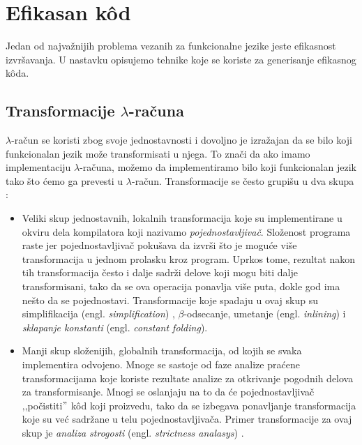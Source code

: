 \section{Efikasan k\^od}
\label{sec:efikasan kod}


Jedan od najvažnijih problema vezanih za funkcionalne jezike jeste efikasnost izvršavanja. 
U nastavku opisujemo tehnike koje se koriste za generisanje efikasnog k\^oda.	


\subsection{Transformacije $\lambda$-računa}

$\lambda$-račun se koristi zbog svoje jednostavnosti i dovoljno je izražajan da se bilo koji funkcionalan jezik može transformisati u njega. To znači da ako imamo implementaciju $\lambda$-računa, možemo da implementiramo  bilo koji funkcionalan jezik tako što ćemo ga prevesti u $\lambda$-račun. Transformacije se često grupišu u dva skupa :


\begin{itemize}
	\item Veliki skup jednostavnih, lokalnih transformacija koje su implementirane u okviru dela kompilatora koji nazivamo \textit{pojednostavljivač}. Složenost programa raste jer pojednostavljivač pokušava da izvrši što je moguće više transformacija u jednom prolasku kroz program. Uprkos tome, rezultat nakon tih transformacija često i dalje sadrži delove koji mogu biti dalje transformisani, tako da se ova operacija ponavlja više puta, dokle god ima nešto da se pojednostavi. Transformacije koje spadaju u ovaj skup su simplifikacija (engl. \textit{simplification}) \cite{compilation-by-program-transformation}, $\beta$-odsecanje, umetanje (engl. \textit{inlining}) i \textit{sklapanje konstanti} (engl. \textit{constant folding}).
	
	\item Manji skup složenijih, globalnih transformacija, od kojih se svaka implementira odvojeno. Mnoge se sastoje od faze analize praćene transformacijama koje koriste rezultate analize za otkrivanje pogodnih delova za transformisanje. Mnogi se oslanjaju na to da će pojednostavljivač ‚‚počistiti$"$ k\^ od koji proizvedu, tako da se izbegava ponavljanje transformacija koje su već sadržane u telu pojednostavljivača. Primer transformacije za ovaj skup je  \textit{analiza strogosti} (engl. \textit{strictness analasys}) \cite{haskell-by-program-transformation}. 
	
\end{itemize}
  

